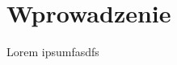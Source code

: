 \chapter*{Wprowadzenie}
Lorem ipsum\newpage fasdfs
\cite{Hecht}\cite{PBRT}\cite{RTFTGU}\cite{OPENGL46}
